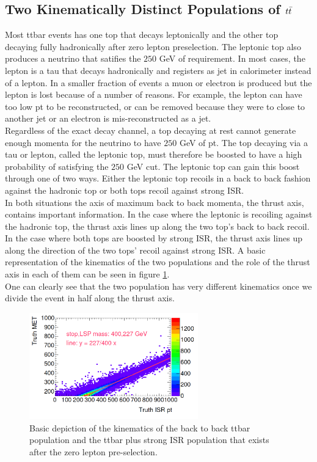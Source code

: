 \subsection{Two Kinematically Distinct Populations of $t\bar{t}$}
\label{sec:Bkg:ttbar:Pop}

\indent Most ttbar events has one top that decays leptonically and the other top decaying fully hadronically after zero lepton preselection. The leptonic top also produces a neutrino that satifies the $250$ GeV of \MET requirement.  In most cases, the lepton is a tau that decays hadronically and registers as jet in calorimeter instead of a lepton.  In a smaller fraction of events a muon or electron is produced but the lepton is lost because of a number of reasons.  For example, the lepton can have too low pt to be reconstructed, or can be removed because they were to close to another jet or an electron is mis-reconstructed as a jet.  \\
\indent Regardless of the exact decay channel, a top decaying at rest cannot generate enough momenta for the neutrino to have $250$ GeV of pt.  The top decaying via a tau or lepton, called the leptonic top, must therefore be boosted to have a high probability of satisfying the $250$ GeV \MET cut.  The leptonic top can gain this boost through one of two ways.  Either the leptonic top recoils in a back to back fashion against the hadronic top or both tops recoil against strong ISR.  \\
\indent In both situations the axis of maximum back to back momenta, the thrust axis, contains important information.  In the case where the leptonic is recoiling against the hadronic top, the thrust axis lines up along the two top's back to back recoil.  In the case where both tops are boosted by strong ISR, the thrust axis lines up along the direction of the two tops' recoil against strong ISR. A basic representation of the kinematics of the two populations and the role of the thrust axis in each of them can be seen in figure \ref{fig:ttbar:2pop}. \\
\indent One can clearly see that the two population has very different kinematics once we divide the event in half along the thrust axis.  \\
\begin{figure}[h!]
  \centering
	\includegraphics[width=0.65\textwidth]{./figures/MET_ISR.png}
\caption{\label{fig:ttbar:2pop}{Basic depiction of the kinematics of the back to back ttbar population and the ttbar plus strong ISR population that exists after the zero lepton pre-selection. }}
\end{figure}

